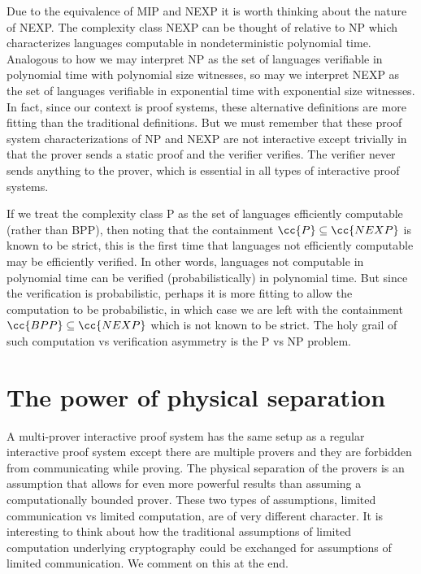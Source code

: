 Due to the equivalence of MIP and NEXP it is worth thinking about the nature of NEXP.
The complexity class NEXP can be thought of relative to NP which characterizes languages computable in nondeterministic polynomial time.
Analogous to how we may interpret NP as the set of languages verifiable in polynomial time with polynomial size witnesses, so may we interpret NEXP as the set of languages verifiable in exponential time with exponential size witnesses.
In fact, since our context is proof systems, these alternative definitions are more fitting than the traditional definitions.
But we must remember that these proof system characterizations of NP and NEXP are not interactive except trivially in that the prover sends a static proof and the verifier verifies.
The verifier never sends anything to the prover, which is essential in all types of interactive proof systems.

If we treat the complexity class P as the set of languages efficiently computable (rather than BPP), then noting that the containment $\cc{P}\subseteq\cc{NEXP}$ is known to be strict, this is the first time that languages not efficiently computable may be efficiently verified.
In other words, languages not computable in polynomial time can be verified (probabilistically) in polynomial time.
But since the verification is probabilistic, perhaps it is more fitting to allow the computation to be probabilistic, in which case we are left with the containment $\cc{BPP}\subseteq\cc{NEXP}$ which is not known to be strict.
The holy grail of such computation vs verification asymmetry is the P vs NP problem.


\section{The power of physical separation}

A multi-prover interactive proof system has the same setup as a regular interactive proof system except there are multiple provers and they are forbidden from communicating while proving.
The physical separation of the provers is an assumption that allows for even more powerful results than assuming a computationally bounded prover.
These two types of assumptions, limited communication vs limited computation, are of very different character.
It is interesting to think about how the traditional assumptions of limited computation underlying cryptography could be exchanged for assumptions of limited communication.
We comment on this at the end.

